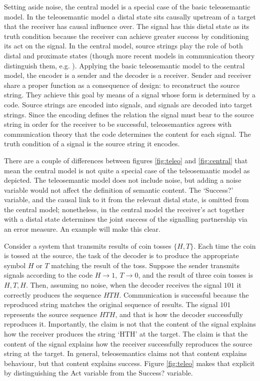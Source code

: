 \documentclass[12pt]{article}
\begin{document}
Setting aside noise, the central model is a special case of the basic teleosemantic model.
In the teleosemantic model a distal state sits causally upstream of a target that the receiver has causal influence over.
The signal has this distal state as its truth condition because the receiver can achieve greater success by conditioning its act on the signal.
In the central model, source strings play the role of both distal and proximate states (though more recent models in communication theory distinguish them, e.g. \citet{berger1996ceo}).
Applying the basic teleosemantic model to the central model, the encoder is a sender and the decoder is a receiver.
Sender and receiver share a proper function as a consequence of design: to reconstruct the source string.
They achieve this goal by means of a signal whose form is determined by a code.
Source strings are encoded into signals, and signals are decoded into target strings.
Since the encoding defines the relation the signal must bear to the source string in order for the receiver to be successful, teleosemantics agrees with communication theory that the code determines the content for each signal.
The truth condition of a signal is the source string it encodes.

There are a couple of differences between figures \ref{fig:teleo} and \ref{fig:central} that mean the central model is not quite a special case of the teleosemantic model as depicted.
The teleosemantic model does not include noise, but adding a noise variable would not affect the definition of semantic content.
The `Success?' variable, and the causal link to it from the relevant distal state, is omitted from the central model; nonetheless, in the central model the receiver's act together with a distal state determines the joint success of the signalling partnership via an error measure.
An example will make this clear.

Consider a system that transmits results of coin tosses $\{H,T\}$.
Each time the coin is tossed at the source, the task of the decoder is to produce the appropriate symbol $H$ or $T$ matching the result of the toss.
Suppose the sender transmits signals according to the code $H\rightarrow1,\ T\rightarrow0$, and the result of three coin tosses is $H, T, H$.
Then, assuming no noise, when the decoder receives the signal $101$ it correctly produces the sequence $HTH$.
Communication is successful because the reproduced string matches the original sequence of results.
The signal $101$ represents the source sequence $HTH$, and that is how the decoder successfully reproduces it.
Importantly, the claim is not that the content of the signal explains how the receiver produces the string `HTH' at the target.
The claim is that the content of the signal explains how the receiver successfully reproduces the source string at the target.
In general, teleosemantics claims not that content explains behaviour, but that content explains success.
Figure \ref{fig:teleo} makes that explicit by distinguishing the Act variable from the Success? variable.
\end{document}
